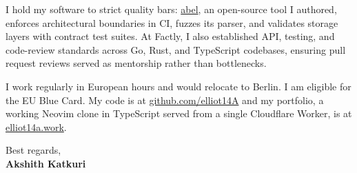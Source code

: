 \documentclass[10pt,a4paper]{article}
\begin{document}
I hold my software to strict quality bars: \href{https://github.com/elliot14A/abel}{abel}, an open-source tool I authored, enforces architectural boundaries in CI, fuzzes its parser, and validates storage layers with contract test suites. At Factly, I also established API, testing, and code-review standards across Go, Rust, and TypeScript codebases, ensuring pull request reviews served as mentorship rather than bottlenecks.

I work regularly in European hours and would relocate to Berlin. I am eligible for the EU Blue Card. My code is at \href{https://github.com/elliot14A}{github.com/elliot14A} and my portfolio, a working Neovim clone in TypeScript served from a single Cloudflare Worker, is at \href{https://elliot14a.work}{elliot14a.work}.

\vspace{5pt}
Best regards,\\[2pt]
\textbf{Akshith Katkuri}
\end{document}
